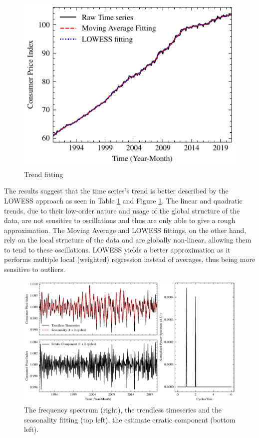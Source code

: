 \documentclass[conference]{IEEEtran}
\begin{document}
\begin{figure}[H]
    \centering
    \includegraphics{../figs/trend.pdf}
    \caption{Trend fitting}
    \label{fig:trend}
\end{figure}

The results suggest that the time series's trend is better described by the LOWESS approach as seen in Table \ref{fig:trend} and Figure \ref{fig:trend}. The linear and quadratic trends, due to their low-order nature and usage of the global structure of the data, are not sensitive to oscillations and thus are only able to give a rough approximation. The Moving Average and LOWESS fittings, on the other hand, rely on the local structure of the data and are globally non-linear, allowing them to tend to these oscillations. LOWESS yields a better approximation as it performs multiple local (weighted) regression instead of averages, thus being more sensitive to outliers.

\begin{figure}[hbtp]
    \centering
    \includegraphics{../figs/season.pdf}
    \caption{The frequency spectrum (right), the trendless timeseries and the seasonality fitting (top left), the estimate erratic component (bottom left).}
    \label{fig:season}
\end{figure}
\end{document}
